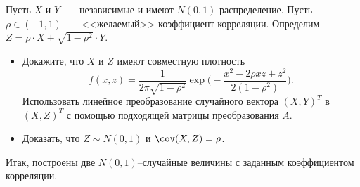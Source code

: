 \begin{problem}
    Пусть $X$ и $Y$~---~независимые и имеют $N(0, 1)$ распределение.
    Пусть $\rho \in (-1, 1)$~---~<<желаемый>> коэффициент корреляции.
    Определим $Z = \rho \cdot X + \sqrt{1 - \rho^2}\cdot Y$.
    \begin{itemize}
        \item Докажите, что $X$ и $Z$ имеют совместную плотность
            \[
                f(x, z) = \dfrac{1}{2\pi \sqrt {1 - \rho^2}}\exp \biggr(- \dfrac{x^2 - 2\rho x z + z^2}{2(1 - \rho^2)} \biggr).
            \]
            Использовать линейное преобразование случайного вектора $(X, Y)^T$ в $(X, Z)^T$ с помощью подходящей матрицы преобразования $A$.
        \item Доказать, что $Z \sim N(0, 1)$ и $\cov(X, Z) = \rho$.
    \end{itemize}
    Итак, построены две $N(0, 1)$--случайные величины с заданным коэффициентом корреляции.
\end{problem}
